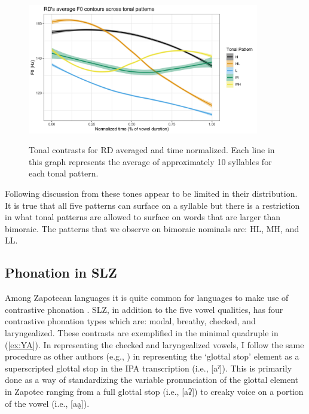 \documentclass[12pt, letterpaper]{article}
\begin{document}
\begin{figure}[!ht]
	\centering
	\includegraphics[width=0.9\textwidth]{../RDTonePlot.png}
	\label{fig:RDTonePlot}
	\caption{Tonal contrasts for RD averaged and time normalized. Each line in this graph represents the average of approximately 10 syllables for each tonal pattern.}
\end{figure}

Following discussion from \citet{brinkerhoffTonalPatternsTheir2022} these tones appear to be limited in their distribution. It is true that all five patterns can surface on a syllable but there is a restriction in what tonal patterns are allowed to surface on words that are larger than bimoraic. The patterns that we observe on bimoraic nominals are: HL, MH, and LL.

\subsection{Phonation in SLZ} \label{sec:Phonation}

Among Zapotecan languages it is quite common for languages to make use of contrastive phonation \citep[e.g.,][]{avelinobecerraTopicsYalalagZapotec2004,longDiccionarioZapotecoSan2005,avelinoAcousticElectroglottographicAnalyses2010,lopeznicolasEstudiosFonologiaGramatica2016,chavez-peonInteractionMetricalStructure2010}. 
SLZ, in addition to the five vowel qualities, has four contrastive phonation types which are: modal, breathy, checked, and laryngealized. These contrasts are exemplified in the minimal quadruple in (\ref{ex:YA}). In representing the checked and laryngealized vowels, I follow the same procedure as other authors (e.g., \citet{avelinoAcousticElectroglottographicAnalyses2010, uchiharaToneRegistrogenesisQuiavini2016}) in representing the `glottal stop' element as a superscripted glottal stop in the IPA transcription (i.e., [aˀ]). This is primarily done as a way of standardizing the variable pronunciation of the glottal element in Zapotec ranging from a full glottal stop (i.e., [aʔ]) to creaky voice on a portion of the vowel (i.e., [aa̰]).  
\end{document}
